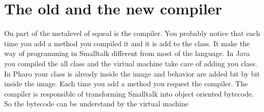 \documentclass[a4paper,10pt,twoside]{book}
\begin{document}
	\renewcommand{\nnbb}[2]{} %
	\sloppy
\fi
\chapter{The old and the new compiler}
\chapterauthor{\authormarcus{}}

On part of the metalevel of squeal is the compiler. 
You probably notice that each time you add a method you compiled it and it is add to the class.
It make the way of programming in Smalltalk different from most of the language.
In Java you compiled the all class and the virtual machine take care of adding you class.
In Pharo your class is already inside the image and behavior are added bit by bit inside the image.
Each time you add a method you request the compiler.
The compiler is responsible of transforming Smalltalk into object oriented bytecode. 
So the bytecode can be understand by the virtual machine


\ifx\wholebook\relax\else
   
   
\end{document}
